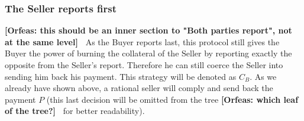 \documentclass{cacthesis}
\newcommand{\authnote}[3]{{ \footnotesize \textbf{#1[#2: #3]~}}}
\newcommand{\orfnote}[1]{\authnote{\color{blue}}{Orfeas}{#1}}
\begin{document}
\subsubsection{The Seller reports first} \orfnote{this should be an inner
section to "Both parties report", not at the same level}
As the Buyer reports last, this protocol still gives the Buyer the power of
burning the collateral of the Seller by reporting exactly the opposite from the
Seller's report.\newline
Therefore he can still coerce the Seller into sending him back his payment. This
strategy will be denoted as $C_B$. As we already have shown above, a rational
seller will comply and send back the payment $P$ (this last decision will be
omitted from the tree \orfnote{which leaf of the tree?} for better readability).\newline
\end{document}
